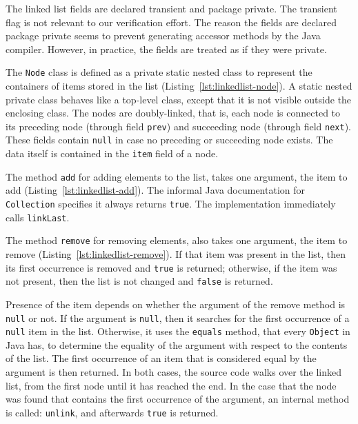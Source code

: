 \documentclass[runningheads]{llncs}
\begin{document}
The linked list fields are declared transient and package private. The transient flag is not relevant to our verification effort. The reason the fields are declared package private seems to prevent generating accessor methods by the Java compiler. However, in practice, the fields are treated as if they were private.



The \texttt{Node} class is defined as a private static nested class to represent the containers of items stored in the list (Listing~\ref{lst:linkedlist-node}). A static nested private class behaves like a top-level class, except that it is not visible outside the enclosing class. The nodes are doubly-linked, that is, each node is connected to its preceding node (through field \texttt{prev}) and succeeding node (through field \texttt{next}). These fields contain \texttt{null} in case no preceding or succeeding node exists. The data itself is contained in the \texttt{item} field of a node.



The method \texttt{add} for adding elements to the list, takes one argument, the item to add (Listing~\ref{lst:linkedlist-add}). The informal Java documentation for \texttt{Collection} specifies it always returns \texttt{true}. The implementation immediately calls \texttt{linkLast}.



The method \texttt{remove} for removing elements, also takes one argument, the item to remove (Listing~\ref{lst:linkedlist-remove}). If that item was present in the list, then its first occurrence is removed and \texttt{true} is returned; otherwise, if the item was not present, then the list is not changed and \texttt{false} is returned.

Presence of the item depends on whether the argument of the remove method is \texttt{null} or not. If the argument is \texttt{null}, then it searches for the first occurrence of a \texttt{null} item in the list. Otherwise, it uses the \texttt{equals} method, that every \texttt{Object} in Java has, to determine the equality of the argument with respect to the contents of the list. The first occurrence of an item that is considered equal by the argument is then returned. In both cases, the source code walks over the linked list, from the first node until it has reached the end. In the case that the node was found that contains the first occurrence of the argument, an internal method is called: \texttt{unlink}, and afterwards \texttt{true} is returned.
\end{document}
